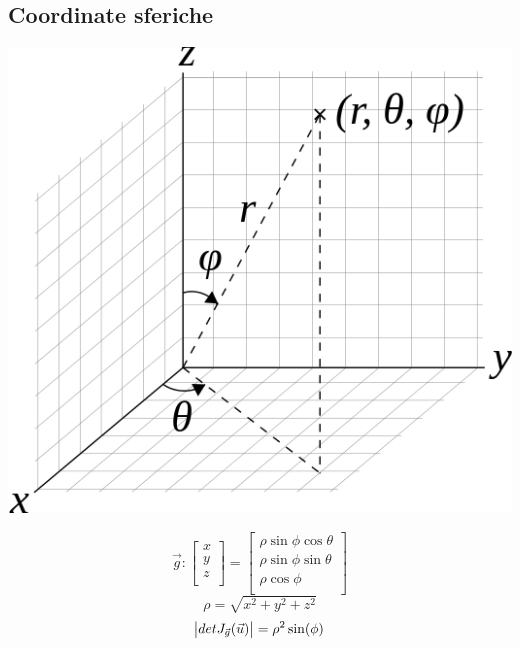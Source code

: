 \documentclass[a4paper,portrait,columns=3,5pt]{cheatsheet}
\begin{document}
\subsection{Coordinate sferiche}
\begin{center}
	\includegraphics[scale=.2]{spherical.png}
\end{center}
\begin{equation*}
	\vec{g} :
	\begin{bmatrix}
		x \\
		y \\
		z \\
	\end{bmatrix} =
	\begin{bmatrix}
		\rho \sin \phi \cos \theta \\
		\rho \sin \phi \sin \theta \\
		\rho \cos \phi             \\
	\end{bmatrix}
\end{equation*}
\begin{equation*}
	\rho = \sqrt{x^2 + y^2 + z^2}
\end{equation*}
\begin{equation*}
	\abs{detJ_{\vec{g}}(\vec{u})} = \rho^2 \sin(\phi)
\end{equation*}
\end{document}

